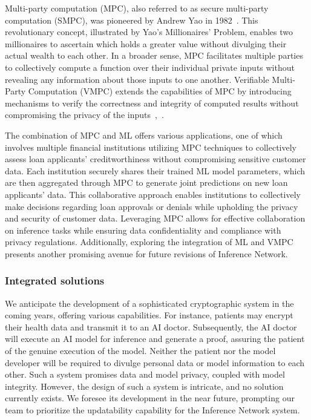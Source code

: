 \documentclass[conference]{IEEEtran}
\begin{document}
Multi-party computation (MPC), also referred to as secure multi-party computation (SMPC), was pioneered by Andrew Yao in 1982~\cite{Yao1982ProtocolsFS}. This revolutionary concept, illustrated by Yao's Millionaires' Problem, enables two millionaires to ascertain which holds a greater value without divulging their actual wealth to each other. In a broader sense, MPC facilitates multiple parties to collectively compute a function over their individual private inputs without revealing any information about those inputs to one another. Verifiable Multi-Party Computation (VMPC) extends the capabilities of MPC by introducing mechanisms to verify the correctness and integrity of computed results without compromising the privacy of the inputs~\cite{Schoenmakers2015UniversallyVM},~\cite{Laud2014VerifiableCI}.

The combination of MPC and ML offers various applications, one of which involves multiple financial institutions utilizing MPC techniques to collectively assess loan applicants' creditworthiness without compromising sensitive customer data. Each institution securely shares their trained ML model parameters, which are then aggregated through MPC to generate joint predictions on new loan applicants' data. This collaborative approach enables institutions to collectively make decisions regarding loan approvals or denials while upholding the privacy and security of customer data. Leveraging MPC allows for effective collaboration on inference tasks while ensuring data confidentiality and compliance with privacy regulations. Additionally, exploring the integration of ML and VMPC presents another promising avenue for future revisions of Inference Network.


\subsubsection{Integrated solutions}

We anticipate the development of a sophisticated cryptographic system in the coming years, offering various capabilities. For instance, patients may encrypt their health data and transmit it to an AI doctor. Subsequently, the AI doctor will execute an AI model for inference and generate a proof, assuring the patient of the genuine execution of the model. Neither the patient nor the model developer will be required to divulge personal data or model information to each other. Such a system promises data and model privacy, coupled with model integrity. However, the design of such a system is intricate, and no solution currently exists. We foresee its development in the near future, prompting our team to prioritize the updatability capability for the Inference Network system.
\end{document}
